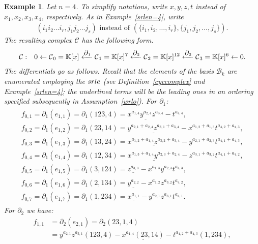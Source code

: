 \documentclass[10pt]{amsart}
\newcommand{\mbk}{\mbox{$\mathbb{K}$}}
\newcommand{\mcb}{\mbox{$\mathcal{B}$}}
\newcommand{\mcc}{\mbox{$\mathcal{C}$}}
\newcommand{\dif}{\mbox{$\partial$}}
\newcommand{\sdif}{\mbox{\tiny $\partial$}}
\newcommand{\srle}{\mbox{${\rm srle}$}}
\newtheorem{example}[cdrthm]{Example}
\theoremstyle{definition}
\theoremstyle{remark}
\begin{document}
\begin{example}\label{cyc4}
Let $n=4$. To simplify notations, write $x,y,z,t$ instead of
$x_1,x_2,x_3,x_4$, respectively. As in Example~\ref{srlen=4}, write
\begin{eqnarray*}
(i_1i_2\ldots i_r,j_1j_2\ldots j_s)\mbox{ instead of }(\{i_1,i_2,\ldots
,i_r\},\{j_1,j_2,\ldots ,j_s\}).
\end{eqnarray*}
The resulting complex $\mcc$ has the following form.
\begin{eqnarray*}
\mcc&:&0\leftarrow
\mcc_0=\mbk[x]\xleftarrow{\sdif_{1}}\mcc_{1}=\mbk[x]^{7}
\xleftarrow{\sdif_{2}}\mcc_{2}=\mbk[x]^{12}\xleftarrow{\sdif_{3}}
\mcc_{3}=\mbk[x]^{6}\xleftarrow{} 0.
\end{eqnarray*}
The differentials go as follows. Recall that the elements of the basis
$\mcb_k$ are enumerated employing the $\srle$ (see
Definition~\ref{cyccomplex} and Example~\ref{srlen=4}; the underlined
terms will be the leading ones in an ordering specified subsequently
in Assumption~\ref{wrlo}). For $\dif_1$:
\begin{eqnarray*}
\begin{array}{l}
f_{0,1}=\dif_1(e_{1,1})=\dif_1(123,4)=
\underline{x^{a_{1,4}}y^{a_{2,4}}z^{a_{3,4}}}-t^{a_{4,4}},\\
f_{0,2}=\dif_1(e_{1,2})=\dif_1(23,14)=
\underline{y^{a_{2,1}+a_{2,4}}z^{a_{3,1}+a_{3,4}}}-
x^{a_{1,2}+a_{1,3}}t^{a_{4,2}+a_{4,3}},\\
f_{0,3}=\dif_1(e_{1,3})=\dif_1(13,24)=
\underline{x^{a_{1,2}+a_{1,4}}z^{a_{3,2}+a_{3,4}}}-
y^{a_{2,1}+a_{2,3}}t^{a_{4,1}+a_{4,3}},\\
f_{0,4}=\dif_1(e_{1,4})=\dif_1(12,34)=
\underline{x^{a_{1,3}+a_{1,4}}y^{a_{2,3}+a_{2,4}}}-
z^{a_{3,1}+a_{3,2}}t^{a_{4,1}+a_{4,2}},\\
f_{0,5}=\dif_1(e_{1,5})=\dif_1(3,124)=
\underline{z^{a_{3,3}}}-x^{a_{1,3}}y^{a_{2,3}}t^{a_{4,3}},\\
f_{0,6}=\dif_1(e_{1,6})=\dif_1(2,134)=
\underline{y^{a_{2,2}}}-x^{a_{1,2}}z^{a_{3,2}}t^{a_{4,2}},\\
f_{0,7}=\dif_1(e_{1,7})=\dif_1(1,234)=
\underline{x^{a_{1,1}}}-y^{a_{2,1}}z^{a_{3,1}}t^{a_{4,1}}.
\end{array}
\end{eqnarray*}
For $\dif_2$ we have:
\begin{align*}
f_{1,1}&= \dif_2(e_{2,1})=\dif_2(23,1,4)\\
&= y^{a_{2,1}}z^{a_{3,1}}(123,4)-\underline{x^{a_{1,4}}(23,14)}-
t^{a_{4,2}+a_{4,3}}(1,234),\\

\end{align*}
\end{example}
\end{document}
